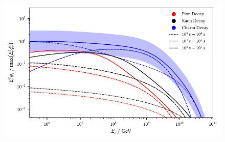 \begin{figure}[H]
	\centering
	\includegraphics{../plots/build/magnetar_integrated_neutrino_spectrum_with.pdf}
	\caption[Magnetar $\nu \kern+0.5pt$ fluence compared to $c$ decay with optical depth.]
			{}
	\label{fig:magnetar-fluence-with}
\end{figure}
